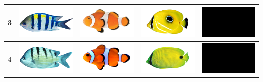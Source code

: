 \begin{longtable}{|c|c|c|c|c|}
    \hline
    3 & \includegraphics[width=3cm]{gambar/abudefduf/A3} & \includegraphics[width=3cm]{gambar/amphiprion/A3} & \includegraphics[width=3cm]{gambar/chaetodon/C3} & \includegraphics[width=3cm]{gambar/negative_examples/N3} \\
    \hline
    4 & \includegraphics[width=3cm]{gambar/abudefduf/A4} & \includegraphics[width=3cm]{gambar/amphiprion/A4} & \includegraphics[width=3cm]{gambar/chaetodon/C4} & \includegraphics[width=3cm]{gambar/negative_examples/N4} \\
    \hline

\end{longtable}
